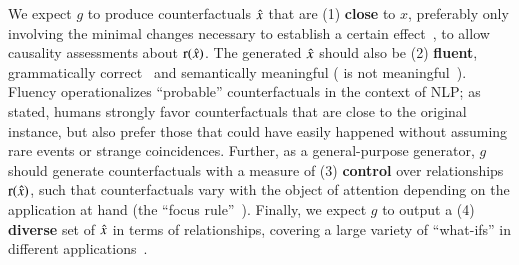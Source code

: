 We expect $g$ to produce counterfactuals $\hat{x}$ that are (1) \textbf{close} to $x$, preferably only involving the minimal changes necessary to establish a certain effect~\cite{pearl2018causal}, to allow causality assessments about $\operatorname*{r}(\hat{x})$.
The generated $\hat{x}$ should also be (2) \textbf{fluent}, \ie grammatically correct~\cite{morris2020textattack} and semantically meaningful (\eg {} is not meaningful~\cite{chomsky2002syntactic}).
Fluency operationalizes ``probable'' counterfactuals in the context of NLP;
as \citet{kahneman} stated, humans strongly favor counterfactuals that are close to the original instance, but also prefer those that could have easily happened without assuming rare events or strange coincidences.
Further, as a general-purpose generator, $g$ should generate counterfactuals with a measure of (3) \textbf{control} over relationships $\operatorname*{r}(\hat{x})$, such that counterfactuals vary with the object of attention depending on the application at hand (the ``focus rule''~\cite{kahneman}).
Finally, %
we expect $g$ to output a (4) \textbf{diverse} set of $\hat{x}$ in terms of relationships, covering a large variety of ``what-ifs'' in different applications~\cite{pearl2018causal}.



